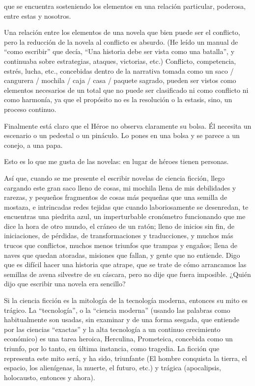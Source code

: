 que se encuentra sosteniendo los elementos en
una relación particular, poderosa, entre estas y
nosotros.

Una relación entre los elementos de una novela
que bien puede ser el conflicto, pero la
reducción de la novela al conflicto es absurdo.
(He leído un manual de ``como escribir'' que
decía, ``Una historia debe ser vista como una
batalla'', y continuaba sobre estrategias, ataques,
victorias, etc.) Conflicto, competencia, estrés,
lucha, etc., concebidas dentro de la narrativa
tomada como un saco / cangurera / mochila / 
caja / casa / paquete
sagrado, pueden ser vistos como elementos
necesarios de un total que no puede ser
clasificado ni como conflicto ni como harmonía,
ya que el propósito no es la resolución o la
estasis, sino, un proceso continuo.

Finalmente está claro que el Héroe no observa
claramente su bolsa. Él necesita un escenario o
un pedestal o un pináculo. Lo pones en una bolsa
y se parece a un conejo, a una papa.

Esto es lo que me gusta de las novelas: en lugar
de héroes tienen personas.

Así que, cuando se me presente el escribir
novelas de ciencia ficción, llego cargando este
gran saco lleno de cosas, mi mochila llena de mis
debilidades y rarezas, y pequeños fragmentos de
cosas más pequeñas que una semilla de mostaza,
e intrincadas redes tejidas que cuando
laboriosamente se desenredan, te encuentras
una piedrita azul, un imperturbable cronómetro 
funcionando que me dice la hora de otro mundo,
el cráneo de un ratón; lleno de inicios sin fin, de
iniciaciones, de pérdidas, de transformaciones y
traducciones, y muchos más trucos que
conflictos, muchos menos triunfos que trampas y
engaños; llena de naves que quedan atoradas,
misiones que fallan, y gente que no entiende.
Digo que es difícil hacer una historia que atrape,
que se trate de cómo arrancamos las semillas de
avena silvestre de su cáscara, pero no dije que
fuera imposible. ¿Quién dijo que escribir una
novela era sencillo?

Si la ciencia ficción es la mitología de la
tecnología moderna, entonces su mito es trágico.
La ``tecnología'', o la ``ciencia moderna'' (usando
las palabras como habitualmente son usadas, sin
examinar y de una forma sesgada, que entiende
por las ciencias ``exactas'' y la alta tecnología a un
continuo crecimiento económico) es una tarea
heroica, Herculina, Prometeica, concebida como
un triunfo, por lo tanto, en última instancia, como
tragedia. La ficción que representa este mito
será, y ha sido, triunfante (El hombre conquista
la tierra, el espacio, los alienígenas, la muerte, el
futuro, etc.) y trágica (apocalipsis, holocausto,
entonces y ahora).

